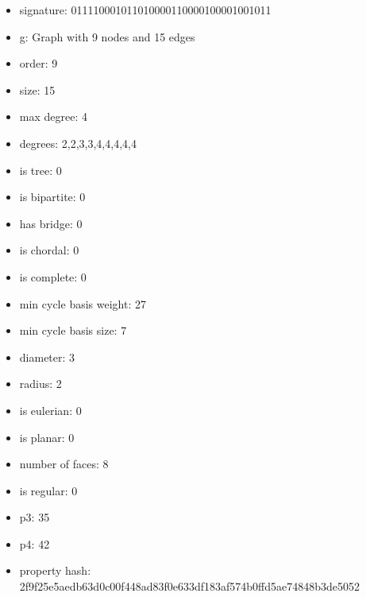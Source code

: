 \begin{figure}
\end{figure}
\begin{itemize}
\item signature: 011110001011010000110000100001001011
\item g: Graph with 9 nodes and 15 edges
\item order: 9
\item size: 15
\item max degree: 4
\item degrees: 2,2,3,3,4,4,4,4,4
\item is tree: 0
\item is bipartite: 0
\item has bridge: 0
\item is chordal: 0
\item is complete: 0
\item min cycle basis weight: 27
\item min cycle basis size: 7
\item diameter: 3
\item radius: 2
\item is eulerian: 0
\item is planar: 0
\item number of faces: 8
\item is regular: 0
\item p3: 35
\item p4: 42
\item property hash: 2f9f25e5aedb63d0c00f448ad83f0e633df183af574b0ffd5ae74848b3de5052
\end{itemize}
\newpage
